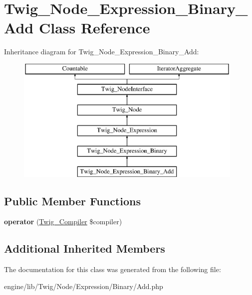 \hypertarget{class_twig___node___expression___binary___add}{}\section{Twig\+\_\+\+Node\+\_\+\+Expression\+\_\+\+Binary\+\_\+\+Add Class Reference}
\label{class_twig___node___expression___binary___add}
Inheritance diagram for Twig\+\_\+\+Node\+\_\+\+Expression\+\_\+\+Binary\+\_\+\+Add\+:\begin{figure}[H]
\begin{center}
\leavevmode
\includegraphics[height=6.000000cm]{class_twig___node___expression___binary___add}
\end{center}
\end{figure}
\subsection*{Public Member Functions}
\begin{DoxyCompactItemize}
\item 
\hypertarget{class_twig___node___expression___binary___add_af77318ec88d5f8a508684970a150b670}{}{\bfseries operator} (\hyperlink{class_twig___compiler}{Twig\+\_\+\+Compiler} \$compiler)\label{class_twig___node___expression___binary___add_af77318ec88d5f8a508684970a150b670}

\end{DoxyCompactItemize}
\subsection*{Additional Inherited Members}


The documentation for this class was generated from the following file\+:\begin{DoxyCompactItemize}
\item 
engine/lib/\+Twig/\+Node/\+Expression/\+Binary/Add.\+php\end{DoxyCompactItemize}

